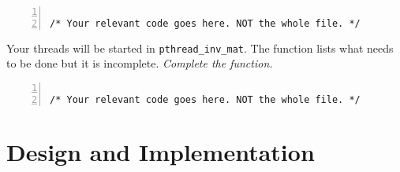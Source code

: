 \documentclass{article}
\begin{document}
\begin{lstlisting}[basicstyle=\small\sffamily,
keywords={break,case,const,continue,default,else,enum,
for,if,return,switch,while,do,long,void,int,float,double,
char,struct,typedef,include,size\_t},
keywordstyle={\color{blue}},
comment={[l]{//}}, morecomment={[s]{/*}{*/}}, commentstyle=\itshape,
columns={[l]flexible}, numbers=left, numberstyle=\tiny,
frameround=fftt, frame=shadowbox, captionpos=b,
caption={Your barrier implementation.},
label=LST:barrier]

/* Your relevant code goes here. NOT the whole file. */
\end{lstlisting}

\begin{ExerciseList}
  \Exercise Your threads will be started in
  \texttt{pthread\_inv\_mat}. The function lists what needs to be done
  but it is incomplete.
  \Question \emph{Complete the function.}
\end{ExerciseList}

\begin{lstlisting}[basicstyle=\small\sffamily,
keywords={break,case,const,continue,default,else,enum,
for,if,return,switch,while,do,long,void,int,float,double,
char,struct,typedef,include,size\_t},
keywordstyle={\color{blue}},
comment={[l]{//}}, morecomment={[s]{/*}{*/}}, commentstyle=\itshape,
columns={[l]flexible}, numbers=left, numberstyle=\tiny,
frameround=fftt, frame=shadowbox, captionpos=b,
caption={Function \texttt{pthread\_inv\_mat}.},
label=LST:pinvmat]

/* Your relevant code goes here. NOT the whole file. */
\end{lstlisting}


\section{Design and Implementation}

\end{document}
